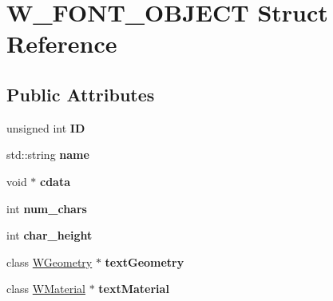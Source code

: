 \hypertarget{struct_w___f_o_n_t___o_b_j_e_c_t}{}\section{W\+\_\+\+F\+O\+N\+T\+\_\+\+O\+B\+J\+E\+CT Struct Reference}
\label{struct_w___f_o_n_t___o_b_j_e_c_t}
\subsection*{Public Attributes}
\begin{DoxyCompactItemize}
\item 
unsigned int {\bfseries ID}\hypertarget{struct_w___f_o_n_t___o_b_j_e_c_t_ac0e5e46ec972c4d63b2b3fc450dafa30}{}\label{struct_w___f_o_n_t___o_b_j_e_c_t_ac0e5e46ec972c4d63b2b3fc450dafa30}

\item 
std\+::string {\bfseries name}\hypertarget{struct_w___f_o_n_t___o_b_j_e_c_t_a3800be882c77e0446b67d3b2eca7dc0b}{}\label{struct_w___f_o_n_t___o_b_j_e_c_t_a3800be882c77e0446b67d3b2eca7dc0b}

\item 
void $\ast$ {\bfseries cdata}\hypertarget{struct_w___f_o_n_t___o_b_j_e_c_t_a7cdc024c644c54076403becc319fb182}{}\label{struct_w___f_o_n_t___o_b_j_e_c_t_a7cdc024c644c54076403becc319fb182}

\item 
int {\bfseries num\+\_\+chars}\hypertarget{struct_w___f_o_n_t___o_b_j_e_c_t_ab98ffc9be0a2b149880f239593bc4efd}{}\label{struct_w___f_o_n_t___o_b_j_e_c_t_ab98ffc9be0a2b149880f239593bc4efd}

\item 
int {\bfseries char\+\_\+height}\hypertarget{struct_w___f_o_n_t___o_b_j_e_c_t_af976db051bf867e57ccf7a7f6824971c}{}\label{struct_w___f_o_n_t___o_b_j_e_c_t_af976db051bf867e57ccf7a7f6824971c}

\item 
class \hyperlink{class_w_geometry}{W\+Geometry} $\ast$ {\bfseries text\+Geometry}\hypertarget{struct_w___f_o_n_t___o_b_j_e_c_t_a3cb896037714c93e1af187c2a0a6d6a5}{}\label{struct_w___f_o_n_t___o_b_j_e_c_t_a3cb896037714c93e1af187c2a0a6d6a5}

\item 
class \hyperlink{class_w_material}{W\+Material} $\ast$ {\bfseries text\+Material}\hypertarget{struct_w___f_o_n_t___o_b_j_e_c_t_a3bc215907cb293a8df42260f21d74f76}{}\label{struct_w___f_o_n_t___o_b_j_e_c_t_a3bc215907cb293a8df42260f21d74f76}


\end{DoxyCompactItemize}
